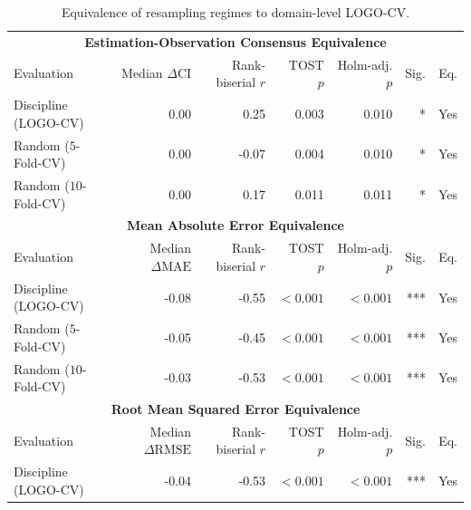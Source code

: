 \documentclass{article}
\begin{document}
\clearpage
\begin{table}[H]
\centering
\footnotesize
\captionsetup{position=top,skip=12pt}
\caption{Equivalence of resampling regimes to domain-level LOGO-CV.}
\label{tab:si-transfer-equivalence}
\begin{tabularx}{\linewidth}{@{}Xrrrrrr@{}}
\toprule
\multicolumn{7}{c}{\textbf{Estimation-Observation Consensus Equivalence}} \\
\cmidrule(lr){1-7}
Evaluation & \shortstack{Median\\$\Delta\mathrm{CI}$} & \shortstack{Rank-biserial\\$r$} & \shortstack{TOST\\$p$} & \shortstack{Holm-adj.\\$p$} & Sig. & Eq. \\
\midrule
Discipline (LOGO-CV) & 0.00 & 0.25 & 0.003 & 0.010 & * & Yes \\
Random ($5$-Fold-CV) & 0.00 & -0.07 & 0.004 & 0.010 & * & Yes \\
Random ($10$-Fold-CV) & 0.00 & 0.17 & 0.011 & 0.011 & * & Yes \\
\midrule
\multicolumn{7}{c}{\textbf{Mean Absolute Error Equivalence}} \\
\cmidrule(lr){1-7}
Evaluation & \shortstack{Median\\$\Delta\mathrm{MAE}$} & \shortstack{Rank-biserial\\$r$} & \shortstack{TOST\\$p$} & \shortstack{Holm-adj.\\$p$} & Sig. & Eq. \\
\midrule
Discipline (LOGO-CV) & -0.08 & -0.55 & $<0.001$ & $<0.001$ & *** & Yes \\
Random ($5$-Fold-CV) & -0.05 & -0.45 & $<0.001$ & $<0.001$ & *** & Yes \\
Random ($10$-Fold-CV) & -0.03 & -0.53 & $<0.001$ & $<0.001$ & *** & Yes \\
\midrule
\multicolumn{7}{c}{\textbf{Root Mean Squared Error Equivalence}} \\
\cmidrule(lr){1-7}
Evaluation & \shortstack{Median\\$\Delta\mathrm{RMSE}$} & \shortstack{Rank-biserial\\$r$} & \shortstack{TOST\\$p$} & \shortstack{Holm-adj.\\$p$} & Sig. & Eq. \\
\midrule
Discipline (LOGO-CV) & -0.04 & -0.53 & $<0.001$ & $<0.001$ & *** & Yes \\

\end{tabularx}
\end{table}
\end{document}
